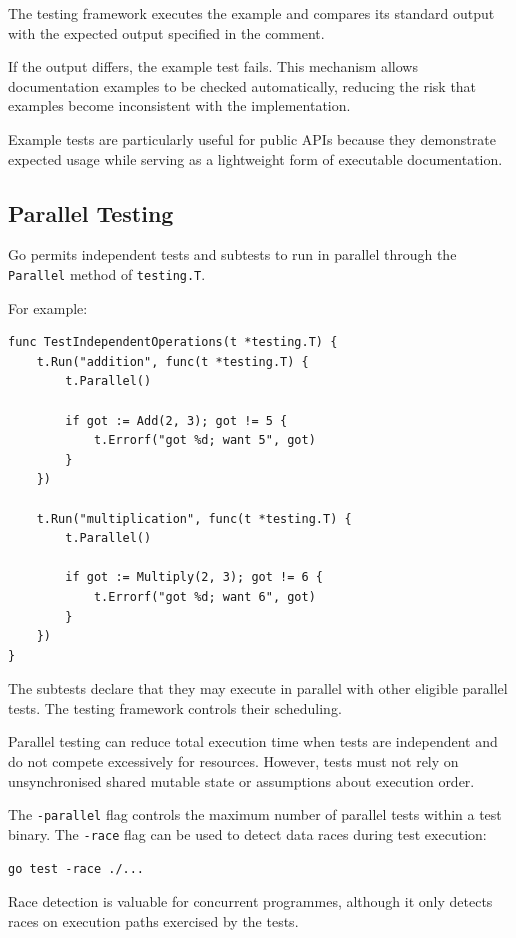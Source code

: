The testing framework executes the example and compares its standard output with the expected output specified in the comment.

If the output differs, the example test fails. This mechanism allows documentation examples to be checked automatically, reducing the risk that examples become inconsistent with the implementation.

Example tests are particularly useful for public APIs because they demonstrate expected usage while serving as a lightweight form of executable documentation.

\subsection{Parallel Testing}

Go permits independent tests and subtests to run in parallel through the \texttt{Parallel} method of \texttt{testing.T}.

For example:

\begin{lstlisting}
func TestIndependentOperations(t *testing.T) {
    t.Run("addition", func(t *testing.T) {
        t.Parallel()

        if got := Add(2, 3); got != 5 {
            t.Errorf("got %d; want 5", got)
        }
    })

    t.Run("multiplication", func(t *testing.T) {
        t.Parallel()

        if got := Multiply(2, 3); got != 6 {
            t.Errorf("got %d; want 6", got)
        }
    })
}
\end{lstlisting}

The subtests declare that they may execute in parallel with other eligible parallel tests. The testing framework controls their scheduling.

Parallel testing can reduce total execution time when tests are independent and do not compete excessively for resources. However, tests must not rely on unsynchronised shared mutable state or assumptions about execution order.

The \texttt{-parallel} flag controls the maximum number of parallel tests within a test binary. The \texttt{-race} flag can be used to detect data races during test execution:

\begin{lstlisting}
go test -race ./...
\end{lstlisting}

Race detection is valuable for concurrent programmes, although it only detects races on execution paths exercised by the tests.

